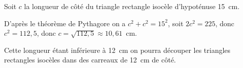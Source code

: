 
\medskip

%
%
%
Soit $c$ la longueur de côté du triangle rectangle isocèle d’hypoténuse 15~cm.

D’après le théorème de Pythagore on a $c^2 + c^2 = 15^2$, soit $2c^2 = 225$, donc $c^2 = 112,5$, donc $c = \sqrt{112,5} \approx 10,61$~cm.

Cette longueur étant inférieure à 12~cm on pourra découper les triangles rectangles isocèles dans des carreaux de 12~cm de côté.
\vspace{0,5cm}

